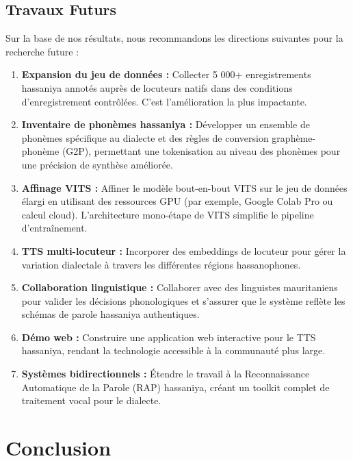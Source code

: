 \documentclass[12pt,a4paper]{article}
\begin{document}
\subsection{Travaux Futurs}

Sur la base de nos résultats, nous recommandons les directions suivantes pour la recherche future :

\begin{enumerate}
    \item \textbf{Expansion du jeu de données :} Collecter 5 000+ enregistrements hassaniya annotés auprès de locuteurs natifs dans des conditions d'enregistrement contrôlées. C'est l'amélioration la plus impactante.

    \item \textbf{Inventaire de phonèmes hassaniya :} Développer un ensemble de phonèmes spécifique au dialecte et des règles de conversion graphème-phonème (G2P), permettant une tokenisation au niveau des phonèmes pour une précision de synthèse améliorée.

    \item \textbf{Affinage VITS :} Affiner le modèle bout-en-bout VITS sur le jeu de données élargi en utilisant des ressources GPU (par exemple, Google Colab Pro ou calcul cloud). L'architecture mono-étape de VITS simplifie le pipeline d'entraînement.

    \item \textbf{TTS multi-locuteur :} Incorporer des embeddings de locuteur pour gérer la variation dialectale à travers les différentes régions hassanophones.

    \item \textbf{Collaboration linguistique :} Collaborer avec des linguistes mauritaniens pour valider les décisions phonologiques et s'assurer que le système reflète les schémas de parole hassaniya authentiques.

    \item \textbf{Démo web :} Construire une application web interactive pour le TTS hassaniya, rendant la technologie accessible à la communauté plus large.

    \item \textbf{Systèmes bidirectionnels :} Étendre le travail à la Reconnaissance Automatique de la Parole (RAP) hassaniya, créant un toolkit complet de traitement vocal pour le dialecte.
\end{enumerate}

\section{Conclusion}
\label{sec:conclusion}
\end{document}
